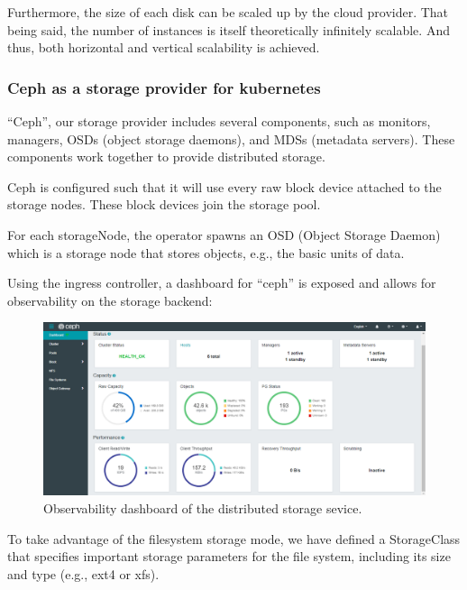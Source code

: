 \hspace{7mm}Furthermore, the size of each disk can be scaled up by the cloud provider. That being said, the number of instances is itself theoretically infinitely scalable. And thus, both horizontal and vertical scalability is achieved. 

\subsubsection{Ceph as a storage provider for kubernetes }

\hspace{7mm}“Ceph”, our storage provider includes several components, such as monitors, managers, OSDs (object storage daemons), and MDSs (metadata servers). These components work together to provide distributed storage.

\hspace{7mm}Ceph is configured such that it will use every raw block device attached to the storage nodes. These block devices join the storage pool.

\hspace{7mm}For each storageNode, the operator spawns an OSD (Object Storage Daemon) which is a storage node that stores objects, e.g., the basic units of data.

\hspace{7mm}Using the ingress controller, a dashboard for “ceph” is exposed and allows for observability on the storage backend: 
\begin{figure}[H]\centering
\includegraphics[width=1.0\textwidth,angle=00]{assets/f29.png}
\caption{Observability dashboard of the distributed storage sevice. }
\label{fig:Ceph Dashboard }
\end{figure}


\hspace{7mm}To take advantage of the filesystem storage mode, we have defined a StorageClass that specifies important storage parameters for the file system, including its size and type (e.g., ext4 or xfs).

